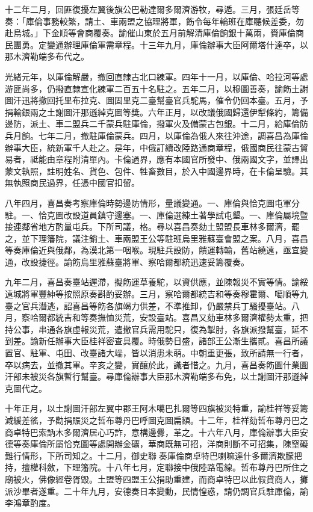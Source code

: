 \begin{pinyinscope}
十二年二月，回匪復擾左翼後旗公巴勒達爾多爾濟游牧，尋遁。三月，張廷岳等奏：「庫倫事務較繁，請土、車兩盟之協理將軍，飭令每年輪班在庫聽候差委，勿赴烏城。」下金順等會商覆奏。諭催山東於五月前解清庫倫餉銀十萬兩，賚庫倫商民團勇。定變通辦理庫倫軍需章程。十三年九月，庫倫辦事大臣阿爾塔什達卒，以那木濟勒端多布代之。

光緒元年，以庫倫解嚴，撤回直隸古北口練軍。四年十一月，以庫倫、哈拉河等處游匪尚多，仍撥直隸宣化練軍二百五十名駐之。五年二月，以穆圖善奏，諭飭土謝圖汗迅將撤回托里布拉克、圖固里克二臺幫臺官兵駝馬，催令仍回本臺。五月，予捐輸銀兩之土謝圖汗那遜綽克圖等獎。六年正月，以改議俄國歸還伊犁條約，籌備邊防，派土、車二盟兵二千蒙兵駐庫倫，撥軍火及備蒙古包銀。十二月，給庫倫防兵月餉。七年二月，撤駐庫倫蒙兵。四月，以庫倫為俄人來往沖途，調喜昌為庫倫辦事大臣，統新軍千人赴之。是年，中俄訂續改陸路通商章程，俄國商民往蒙古貿易者，祗能由章程附清單內。卡倫過界，應有本國官所發中、俄兩國文字，並譯出蒙文執照，註明姓名、貨色、包件、牲畜數目，於入中國邊界時，在卡倫呈驗。其無執照商民過界，任憑中國官扣留。

八年四月，喜昌奏考察庫倫時勢邊防情形，量議變通。一、庫倫與恰克圖屯軍分駐。一、恰克圖改設道員鎮守邊塞。一、庫倫選練土著學試屯墾。一、庫倫屬境暨接連鄰省地方酌量屯兵。下所司議，格。尋以喜昌奏劾土盟盟長車林多爾濟，罷之，並下理籓院，議注銷土、車兩盟王公等駐班烏里雅蘇臺會盟之案。八月，喜昌等奏庫倫近與俄鄰，為漠北第一咽喉。現駐兵設防，饋運轉輸，舊站繞遠，亟宜變通，改設捷徑。諭飭烏里雅蘇臺將軍、察哈爾都統迅速妥籌覆奏。

九年二月，喜昌奏臺站遲滯，擬飭運草養駝，以資供應，並陳報災不實等情。諭綏遠城將軍豐紳等按照原奏斟酌妥辦。三月，察哈爾都統吉和等奏穆霍爾、噶順等九臺之官兵潛逃，詔喜昌等飭各旗竭力供差，不準推卸，仍嚴禁兵丁騷擾臺站。八月，察哈爾都統吉和等奏撫恤災荒，安設臺站。喜昌又劾車林多爾濟權勢太重，把持公事，串通各旗虛報災荒，遣撤官兵需用駝只，復為掣肘，各旗派撥幫臺，延不到差。諭新任辦事大臣桂祥密查具覆。時俄勢日盛，諸部王公漸生攜貳。喜昌所議置官、駐軍、屯田、改臺諸大端，皆以消患未萌。中朝重更張，致所請無一行者，卒以病去，並撤其軍。辛亥之變，實釀於此，識者惜之。九月，喜昌奏飭圖什業圖汗部未被災各旗暫行幫臺。尋庫倫辦事大臣那木濟勒端多布免，以土謝圖汗那遜綽克圖代之。

十年正月，以土謝圖汗部左翼中郡王阿木噶巴扎爾等四旗被災特重，諭桂祥等妥籌減緩差徭，予勸捐賑災之哲布尊丹巴呼圖克圖扁額。十二年，桂祥劾哲布尊丹巴之商卓特巴索訥木多爾濟居心巧詐，意構邊釁，革之。十六年八月，庫倫辦事大臣安德等奏庫倫所屬恰克圖等處開辦金礦，華商既無可招，洋商則斷不可招集，陳窒礙難行情形，下所司知之。十二月，御史聯奏庫倫商卓特巴喇嘛達什多爾濟欺朦把持，擅權科斂，下理籓院。十八年七月，定聯接中俄陸路電線。哲布尊丹巴所住之廟被火，佛像經卷胥毀。土盟等四盟王公捐助重建，而商卓特巴以此假貸商人，攤派沙畢者遂重。二十年九月，安德奏日本變動，民情惶惑，請仍調官兵駐庫倫，諭李鴻章酌度。


\end{pinyinscope}
